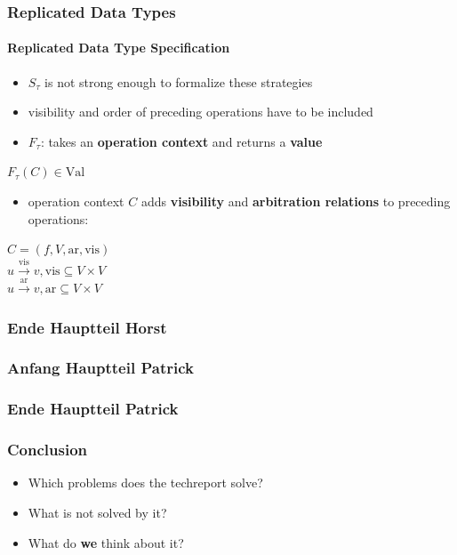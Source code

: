 \documentclass[11pt]{beamer}
\begin{document}
\begin{frame}
\frametitle{Replicated Data Types}
\framesubtitle{Replicated Data Type Specification}
\begin{itemize}
\item \(S_{\tau}\) is not strong enough to formalize these strategies
\pause
\item visibility and order of preceding operations have to be included
\pause
\item \(F_\tau\): takes an \textbf{operation context} and returns a \textbf{value}
\end{itemize}

\begin{center}
\(F_\tau(C) \in \mathrm{Val}\) \\
\end{center}
\pause
\begin{itemize}
\item operation context \(C\) adds \textbf{visibility} and \textbf{arbitration relations} to preceding operations:
\end{itemize}

\begin{center}
\(C = (f, V, \mathrm{ar}, \mathrm{vis})\) \\
\pause
\(u \xrightarrow{\mathrm{vis}} v, \mathrm{vis} \subseteq V \times V  \) \\
\pause
\(u \xrightarrow{\mathrm{ar}} v, \mathrm{ar} \subseteq V \times V  \)
\end{center}

\end{frame}

\begin{frame}

\end{frame}

\begin{frame}
\frametitle{Ende Hauptteil Horst}
\end{frame}

\begin{frame}
\frametitle{Anfang Hauptteil Patrick}
\end{frame}


\begin{frame}
\frametitle{Ende Hauptteil Patrick}
\end{frame}


\begin{frame}
\frametitle{Conclusion}
\begin{itemize}
\item Which problems does the techreport solve?
\item What is not solved by it?
\item What do \textbf{we} think about it?
\end{itemize}
\end{frame}
\end{document}
